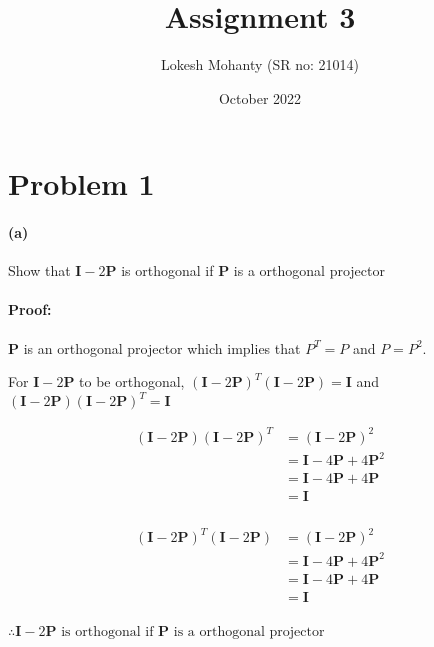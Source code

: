 \documentclass[12pt, letterpaper]{article}
\title{Assignment 3}
\author{Lokesh Mohanty (SR no: 21014)}
\date{October 2022}
\begin{document}
\fontsize{14pt}{18pt}\selectfont

\maketitle

\section*{Problem 1}
\label{sec:prob1}

\paragraph{(a)} Show that $\mathbf{I} - 2\mathbf{P}$ is orthogonal if $\mathbf{P}$ is a orthogonal projector

\paragraph{Proof:}

$\mathbf{P}$ is an orthogonal projector which implies that
$P^T = P$ and $P = P^2$.

For $\mathbf{I} - 2\mathbf{P}$ to be orthogonal, $(\mathbf{I}-2\mathbf{P})^T(\mathbf{I}-2\mathbf{P}) = \mathbf{I}$ and $(\mathbf{I}-2\mathbf{P})(\mathbf{I}-2\mathbf{P})^T = \mathbf{I}$

\begin{align*}
  (\mathbf{I}-2\mathbf{P})(\mathbf{I}-2\mathbf{P})^T &= (\mathbf{I}-2\mathbf{P})^2\\
  &= \mathbf{I} - 4\mathbf{P} + 4\mathbf{P}^2\\
  &= \mathbf{I} - 4\mathbf{P} + 4\mathbf{P}\\
  &= \mathbf{I}\\
\end{align*}

\begin{align*}
  (\mathbf{I}-2\mathbf{P})^T(\mathbf{I}-2\mathbf{P}) &= (\mathbf{I}-2\mathbf{P})^2\\
  &= \mathbf{I} - 4\mathbf{P} + 4\mathbf{P}^2\\
  &= \mathbf{I} - 4\mathbf{P} + 4\mathbf{P}\\
  &= \mathbf{I}\\
\end{align*}

$\therefore \boxed{\mathbf{I} - 2\mathbf{P}\text{ is orthogonal if }\mathbf{P}\text{ is a orthogonal projector}}$
\end{document}
